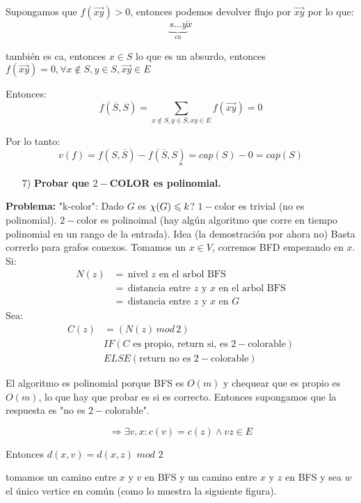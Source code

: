 \documentclass[12pt,a4paper]{article}
\begin{document}
Supongamos que $f(\overrightarrow{xy}) > 0$, entonces podemos devolver flujo por 
$\overrightarrow{xy}$ por lo que:
$$\underbrace{s\ldots y}_{ca}\overleftarrow{x}$$ 

también es ca, entonces $x\in S$ lo que es un absurdo, entonces $f(\overrightarrow{xy}) = 0, \forall x\notin S, y\in S, \overrightarrow{xy}\in E$
\medskip

Entonces:
$$f(\overline{S},S) = \sum_{x\notin S, y\in S, xy\in E} f(\overrightarrow{xy}) = 0$$

Por lo tanto:
$$v(f) = f(S,\overline{S}) - f(\overline{S},S) = cap(S) - 0 = cap(S)$$
$$\square$$

\begin{itemize}
    \item [7)] \textbf{Probar que $2-$COLOR es polinomial.}
    \label{dem:2color}
\end{itemize}

\textbf{Problema:} "k-color": Dado $G$ es $\chi(G) \leqslant k$? $1-$color es trivial 
(no es polinomial). $2-$color es polinoimal (hay algún algoritmo que corre en tiempo 
polinomial en un rango de la entrada). Idea (la demostración por ahora no) Basta 
correrlo para grafos conexos. Tomamos un $x\in V$, corremos BFD empezando en $x$. Si:
\begin{align*}
    N(z) &=\, \text{nivel $z$ en el arbol BFS}\\
         &=\, \text{distancia entre $z$ y $x$ en el arbol BFS}\\
         &=\, \text{distancia entre $z$ y $x$ en $G$}
\end{align*}
Sea: 
\begin{align*}
    C(z) &= (N(z)\, mod\, 2)\\
    &IF(\text{$C$ es propio, return si, es $2-$colorable})\\
    &ELSE(\text{return no es $2-$colorable})
\end{align*}

El algoritmo es polinomial porque BFS es $O(m)$ y chequear que es propio es $O(m)$,
lo que hay que probar es si es correcto. Entonces supongamos que la respuesta es 
"no es $2-$colorable". 

$$\Rightarrow \exists v,x : c(v) = c(z) \wedge vz \in E$$

Entonces $d(x,v) = d(x,z)\,\,mod\,\, 2$
\medskip

tomamos un camino entre $x$ y $v$ en BFS y un camino entre $x$ y $z$ en BFS y sea 
$w$ el único vertice en común (como lo muestra la siguiente figura).
\end{document}
